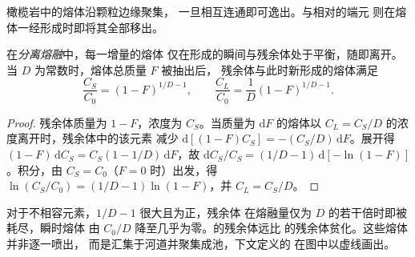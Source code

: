 橄榄岩中的熔体沿颗粒边缘聚集，
一旦相互连通即可逸出。与相对的端元
则在熔体一经形成时即将其全部移出。

\begin{theorem}[分离熔融]\label{thm:b3:trace-element-modelling:fractional}
在\emph{分离熔融}中，每一增量的熔体
仅在形成的瞬间与残余体处于平衡，随即离开。
当 $D$ 为常数时，熔体总质量 $F$ 被抽出后，
残余体与此时新形成的熔体满足
\[
\frac{C_S}{C_0} = (1 - F)^{1/D - 1}, \qquad
\frac{C_L}{C_0} = \frac{1}{D}(1 - F)^{1/D - 1}.
\]
\end{theorem}

\begin{proof}
残余体质量为 $1 - F$，浓度为 $C_S$。当质量为
$\mathrm dF$ 的熔体以 $C_L = C_S/D$ 的浓度离开时，残余体中的该元素
减少 $\mathrm d[(1 - F)C_S] = -(C_S/D)\,\mathrm dF$。展开得
$(1 - F)\,\mathrm dC_S = C_S(1 - 1/D)\,\mathrm dF$，故
$\mathrm dC_S/C_S = (1/D - 1)\,\mathrm d[-\ln(1 - F)]$。积分，由
$C_S = C_0$（$F = 0$ 时）出发，得 $\ln(C_S/C_0) = (1/D - 1)\ln(1 - F)$，并
$C_L = C_S/D$。
\end{proof}

对于不相容元素，$1/D - 1$ 很大且为正，残余体
在熔融量仅为 $D$ 的若干倍时即被耗尽，瞬时熔体
由 $C_0/D$ 降至几乎为零。的残余体远比
的残余体贫化。这些熔体并非逐一喷出，
而是汇集于河道并聚集成池，下文定义的
在图中以虚线画出。

